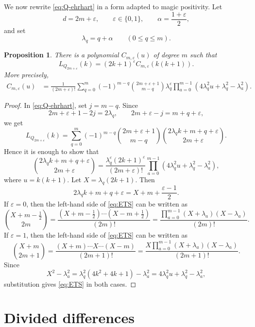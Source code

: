 \documentclass[12pt]{amsart}
\newtheorem{Proposition}[Theorem]{Proposition}
\theoremstyle{definition}
\begin{document}
We now rewrite \eqref{eq:Q-ehrhart} in a form adapted to magic positivity.
Let
\[
d=2m+\varepsilon,
\qquad
\varepsilon\in\{0,1\},
\qquad
\alpha=\frac{1+\varepsilon}{2},
\]
and set
\[
\lambda_q=q+\alpha
\qquad(0\le q\le m).
\]

\begin{Proposition}\label{prop:Q-factorization}
There is a polynomial $C_{m,\varepsilon}(u)$ of degree $m$ such that
\[
L_{Q_{2m+\varepsilon}}(k)
=
(2k+1)^\varepsilon
C_{m,\varepsilon}(k(k+1)).
\]
More precisely,
\begin{equation}\label{eq:C-product}
\begin{aligned}
C_{m,\varepsilon}(u)
&=
\frac1{(2m+\varepsilon)!}
\sum_{q=0}^{m}
(-1)^{m-q}
\binom{2m+\varepsilon+1}{m-q}\lambda_q^\varepsilon
\prod_{a=0}^{m-1}
\left(
4\lambda_q^2u+\lambda_q^2-\lambda_a^2
\right).
\end{aligned}
\end{equation}
\end{Proposition}

\begin{proof}
In \eqref{eq:Q-ehrhart}, set $j=m-q$.  Since
\[
2m+\varepsilon+1-2j=2\lambda_q,
\qquad
2m+\varepsilon-j=m+q+\varepsilon,
\]
we get
\[
L_{Q_{2m+\varepsilon}}(k)
=
\sum_{q=0}^{m}
(-1)^{m-q}
\binom{2m+\varepsilon+1}{m-q}
\binom{2\lambda_q k+m+q+\varepsilon}{2m+\varepsilon}.
\]
Hence it is enough to show that 
\begin{equation}\label{eq:ETS}
\binom{2\lambda_q k+m+q+\varepsilon}{2m+\varepsilon}
=
\frac{\lambda_q^\varepsilon(2k+1)^\varepsilon}
{(2m+\varepsilon)!}
\prod_{a=0}^{m-1}
\left(
4\lambda_q^2u+\lambda_q^2-\lambda_a^2
\right),
\end{equation}
where $u=k(k+1)$.
Let $X=\lambda_q(2k+1)$.
Then 
\[
2\lambda_q k+m+q+\varepsilon
=
X+m+\frac{\varepsilon-1}{2}.
\]
If $\varepsilon=0$, then the left-hand side of \eqref{eq:ETS} can be written as
\[
\binom{X +m-\frac1 2}{2m}
=
\frac{(X +m-\frac1 2) \cdots (X -m+\frac1 2) }{(2m)!}
=
\frac{\prod_{a=0}^{m-1} (X + \lambda_a)(X - \lambda_a) }{(2m)!}.
\]
If $\varepsilon=1$,  then the left-hand side of \eqref{eq:ETS} can be written as
\[
\binom{X +m}{2m+1}
=
\frac{(X +m) \cdots X \cdots (X -m) }{(2m+1)!}
=
\frac{X \prod_{a=0}^{m-1} (X + \lambda_a)(X - \lambda_a) }{(2m+1)!}.
\]
Since
\[
X^2-\lambda_a^2
=
\lambda_q^2 (4k^2+4k +1)-\lambda_a^2
=
4\lambda_q^2u+\lambda_q^2-\lambda_a^2,
\]
substitution gives \eqref{eq:ETS} in both
cases.
\end{proof}

\section{Divided differences}\label{sec:dd}
\end{document}
